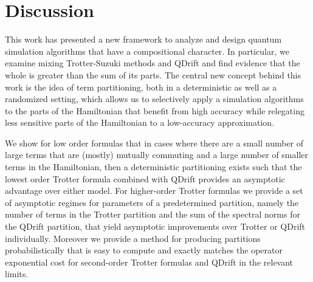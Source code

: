 
\section{Discussion}\label{sec:discussion}
This work has presented a new framework to analyze and design quantum simulation algorithms that have a compositional character.  In particular, we examine mixing Trotter-Suzuki methods and QDrift and find evidence that the whole is greater than the sum of its parts.  The central new concept behind this work is the idea of term partitioning, both in a deterministic as well as a randomized setting, which allows us to selectively apply a simulation algorithms to the parts of the Hamiltonian that benefit from high accuracy while relegating less sensitive parts of the Hamiltonian to a low-accuracy approximation.  

We show for low order formulas that in cases where there are a small number of large terms that are (mostly) mutually commuting and a large number of smaller terms in the Hamiltonian, then a deterministic partitioning exists such that the lowest order Trotter formula combined with QDrift provides an asymptotic advantage over either model.  For higher-order Trotter formulas we provide a set of asymptotic regimes for parameters of a predetermined partition, namely the number of terms in the Trotter partition and the sum of the spectral norms for the QDrift partition, that yield asymptotic improvements over Trotter or QDrift individually. Moreover we provide a method for producing partitions probabilistically that is easy to compute and exactly matches the operator exponential cost for second-order Trotter formulas and QDrift in the relevant limits. 

